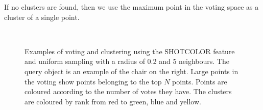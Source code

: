 \documentclass[11pt,a4paper]{kth-mag}
\begin{document}
If no clusters are found, then we use the maximum point in the voting space as a
cluster of a single point.
\begin{figure}
  \centering
  \\
  \caption{Examples of voting and clustering using the SHOTCOLOR feature and
    uniform sampling with a radius of 0.2 and 5 neighbours. The query object is
    an example of the chair on the right. Large points in the voting show points
    belonging to the top $N$ points. Points are coloured according to the number
    of votes they have. The clusters are coloured by rank from red to green,
    blue and yellow.}
  \label{fig:clusters_ex}
\end{figure}
\end{document}
